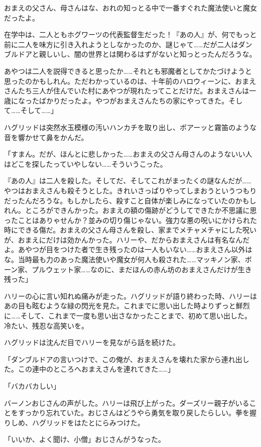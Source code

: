 \documentclass[10pt,a4paper]{article}
\begin{document}
\begin{CJK}{UTF8}{min}
おまえの父さん、母さんはな、おれの知っとる中で一番すぐれた魔法使いと魔女だったよ。

在学中は、二人ともホグワーツの代表監督生だった！『あの人』が、何でもっと前に二人を味方に引き入れようとしなかったのか、謎じゃて……だが二人はダンブルドアと親しいし、闇の世界とは関わるはずがないと知っとったんだろうな。

あやつは二人を説得できると思ったか……それとも邪魔者としてかたづけようと思ったのかもしれん。ただわかっているのは、十年前のハロウィーンに、おまえさんたち三人が住んでいた村にあやつが現れたってことだけだ。おまえさんは一歳になったばかりだったよ。やつがおまえさんたちの家にやってきた。そして……そして……」

ハグリッドは突然水玉模様の汚いハンカチを取り出し、ボアーッと霧笛のような音を響かせて鼻をかんだ。

「すまん。だが、ほんとに悲しかった……おまえの父さん母さんのようないい人はどこを探したっていやしない……そういうこった。

『あの人』は二人を殺した。そしてだ、そしてこれがまったくの謎なんだが……やつはおまえさんも殺そうとした。きれいさっぱりやってしまおうというつもりだったんだろうな。もしかしたら、殺すこと自体が楽しみになっていたのかもしれん。ところができんかった。おまえの額の傷跡がどうしてできたか不思議に思ったことはありゃせんか？並みの切り傷じゃない。強力な悪の呪いにかけられた時にできる傷だ。おまえの父さん母さんを殺し、家までメチャメチャにした呪いが、おまえにだけは効かんかった。ハリーや、だからおまえさんは有名なんだよ。あやつが目をつけた者で生き残ったのは一人もいない……おまえさん以外はな。当時最も力のあった魔法使いや魔女が何人も殺された……マッキノン家、ボーン家、プルウェット家……なのに、まだほんの赤ん坊のおまえさんだけが生き残った」

ハリーの心に言い知れぬ痛みが走った。ハグリッドが語り終わった時、ハリーはあの目も眩むような緑の閃光を見た。これまでに思い出した時よりずっと鮮烈に……そして、これまで一度も思い出さなかったことまで、初めて思い出した。冷たい、残忍な高笑いを。

ハグリッドは沈んだ目でハリーを見ながら話を続けた。

「ダンブルドアの言いつけで、この俺が、おまえさんを壊れた家から連れ出した。この連中のところへおまえさんを連れてきた……」

「バカバカしい」

バーノンおじさんの声がした。ハリーは飛び上がった。ダーズリー親子がいることをすっかり忘れていた。おじさんはどうやら勇気を取り戻したらしい。拳を握りしめ、ハグリッドをはたとにらみつけた。

「いいか、よく聞け、小僧」おじさんがうなった。


\end{CJK}
\end{document}
